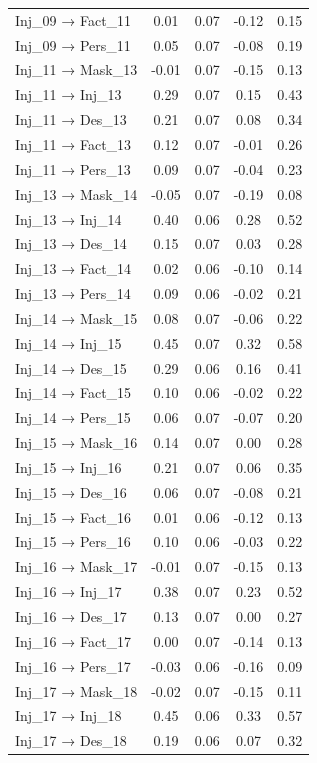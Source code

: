 \documentclass[
  man, donotrepeattitle,floatsintext]{apa6}
\begin{document}
\begin{center}
\begin{ThreePartTable}
{\begin{longtable}{lcccc}
Inj\_09 → Fact\_11 & 0.01 & 0.07 & -0.12 & 0.15\\
Inj\_09 → Pers\_11 & 0.05 & 0.07 & -0.08 & 0.19\\
Inj\_11 → Mask\_13 & -0.01 & 0.07 & -0.15 & 0.13\\
Inj\_11 → Inj\_13 & 0.29 & 0.07 & 0.15 & 0.43\\
Inj\_11 → Des\_13 & 0.21 & 0.07 & 0.08 & 0.34\\
Inj\_11 → Fact\_13 & 0.12 & 0.07 & -0.01 & 0.26\\
Inj\_11 → Pers\_13 & 0.09 & 0.07 & -0.04 & 0.23\\
Inj\_13 → Mask\_14 & -0.05 & 0.07 & -0.19 & 0.08\\
Inj\_13 → Inj\_14 & 0.40 & 0.06 & 0.28 & 0.52\\
Inj\_13 → Des\_14 & 0.15 & 0.07 & 0.03 & 0.28\\
Inj\_13 → Fact\_14 & 0.02 & 0.06 & -0.10 & 0.14\\
Inj\_13 → Pers\_14 & 0.09 & 0.06 & -0.02 & 0.21\\
Inj\_14 → Mask\_15 & 0.08 & 0.07 & -0.06 & 0.22\\
Inj\_14 → Inj\_15 & 0.45 & 0.07 & 0.32 & 0.58\\
Inj\_14 → Des\_15 & 0.29 & 0.06 & 0.16 & 0.41\\
Inj\_14 → Fact\_15 & 0.10 & 0.06 & -0.02 & 0.22\\
Inj\_14 → Pers\_15 & 0.06 & 0.07 & -0.07 & 0.20\\
Inj\_15 → Mask\_16 & 0.14 & 0.07 & 0.00 & 0.28\\
Inj\_15 → Inj\_16 & 0.21 & 0.07 & 0.06 & 0.35\\
Inj\_15 → Des\_16 & 0.06 & 0.07 & -0.08 & 0.21\\
Inj\_15 → Fact\_16 & 0.01 & 0.06 & -0.12 & 0.13\\
Inj\_15 → Pers\_16 & 0.10 & 0.06 & -0.03 & 0.22\\
Inj\_16 → Mask\_17 & -0.01 & 0.07 & -0.15 & 0.13\\
Inj\_16 → Inj\_17 & 0.38 & 0.07 & 0.23 & 0.52\\
Inj\_16 → Des\_17 & 0.13 & 0.07 & 0.00 & 0.27\\
Inj\_16 → Fact\_17 & 0.00 & 0.07 & -0.14 & 0.13\\
Inj\_16 → Pers\_17 & -0.03 & 0.06 & -0.16 & 0.09\\
Inj\_17 → Mask\_18 & -0.02 & 0.07 & -0.15 & 0.11\\
Inj\_17 → Inj\_18 & 0.45 & 0.06 & 0.33 & 0.57\\
Inj\_17 → Des\_18 & 0.19 & 0.06 & 0.07 & 0.32\\

\end{longtable}}
\end{ThreePartTable}
\end{center}
\end{document}

